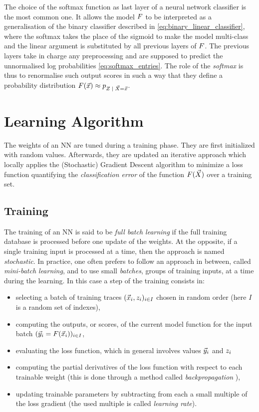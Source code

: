 The choice of the softmax function as last layer of a neural network classifier is the most common one. It allows the model $F$ to be interpreted as a generalisation of the binary classifier described in \eqref{eq:binary_linear_classifier}, where the softmax takes the place of the sigmoid to make the model multi-class and the linear argument is substituted by all previous layers of $F$. The previous layers take in charge any preprocessing and are supposed to predict the unnormalised log probabilities \eqref{eq:softmax_entries}. The role of the \emph{softmax} is thus to renormalise such output scores in such a way that they define a probability distribution $\MLmodel(\vLeakVec) \approx \pdf_{\given{\sensRandVar}{\vaLeakVec=\vLeakVec}}$. 

\section{Learning Algorithm}\label{sec:learningAlgorithm}
The weights of an NN are tuned during a training phase. They are first initialized with random values. Afterwards, they are updated  \via an
iterative approach which locally applies the (Stochastic) Gradient Descent
algorithm \cite{Goodfellow-et-al-2016} to minimize a loss function
quantifying the \emph{classification error} of the function
$F(\vec{X})$ over a training set.

\subsection{Training}\label{sec:training}
The training of an NN is said to be \emph{full batch learning} if
the full training database is processed before one update of the weights. At the opposite, if
a single training input is processed at a time, then the approach is named
\emph{stochastic}. In practice, one often prefers to follow an approach in
between, called \emph{mini-batch learning}, and to use small \emph{batches}, \ie
groups of training inputs, at a time during the learning. In this case a step of the training consists in: 
\begin{itemize}
\item selecting a batch of training traces $(\vec{x}_i, z_i)_{i\in I}$ chosen in random order (here $I$ is a random set of indexes),
\item computing the outputs, or scores, of the current model function for the input batch $(\vec{y}_i = F(\vec{x}_i))_{i\in I}$, 
\item evaluating the loss function, which in general involves values $\vec{y}_i$ and $z_i$
\item computing the partial derivatives of the loss function with respect to each trainable weight (this is done through a method called \emph{backpropagation} \cite{LeCun2012}),
\item updating trainable parameters by subtracting from each a small multiple of the loss gradient (the used multiple is called \emph{learning rate}).
\end{itemize}  

